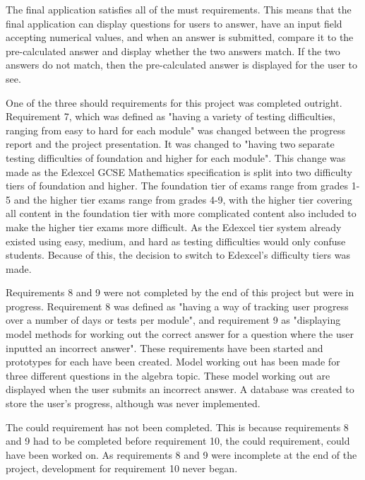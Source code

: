 \documentclass{article}
\begin{document}
The final application satisfies all of the must requirements. This means that the final application can display questions for users to answer, have an input field accepting numerical values, and when an answer is submitted, compare it to the pre-calculated answer and display whether the two answers match. If the two answers do not match, then the pre-calculated answer is displayed for the user to see. \par

One of the three should requirements for this project was completed outright. Requirement 7, which was defined as "having a variety of testing difficulties, ranging from easy to hard for each module" was changed between the progress report and the project presentation. It was changed to "having two separate testing difficulties of foundation and higher for each module". This change was made as the Edexcel GCSE Mathematics specification is split into two difficulty tiers of foundation and higher. The foundation tier of exams range from grades 1-5 and the higher tier exams range from grades 4-9, with the higher tier covering all content in the foundation tier with more complicated content also included to make the higher tier exams more difficult. As the Edexcel tier system already existed using easy, medium, and hard as testing difficulties would only confuse students. Because of this, the decision to switch to Edexcel's difficulty tiers was made. \par

Requirements 8 and 9 were not completed by the end of this project but were in progress. Requirement 8 was defined as "having a way of tracking user progress over a number of days or tests per module", and requirement 9 as "displaying model methods for working out the correct answer for a question where the user inputted an incorrect answer". These requirements have been started and prototypes for each have been created. Model working out has been made for three different questions in the algebra topic. These model working out are displayed when the user submits an incorrect answer. A database was created to store the user's progress, although was never implemented. \par

The could requirement has not been completed. This is because requirements 8 and 9 had to be completed before requirement 10, the could requirement, could have been worked on. As requirements 8 and 9 were incomplete at the end of the project, development for requirement 10 never began. \par
\end{document}
